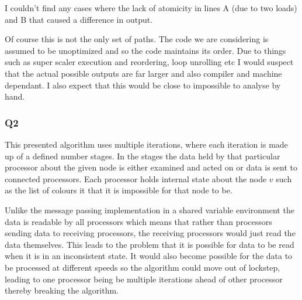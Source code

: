 \documentclass[11pt,a4paper]{article}
\begin{document}
I couldn't find any cases where the lack of atomicity in lines A (due to two loads)
and B that caused a difference in output.

Of course this is not the only set of paths. The code we are
considering is assumed to be unoptimized and so the code maintains its order. Due to things
such as super scaler execution and reordering, loop unrolling etc I
would suspect that the actual possible outputs are far larger and also
compiler and machine dependant. I also expect that this would be close
to impossible to analyse by hand.

\newpage
\subsubsection*{Q2}

This presented algorithm uses multiple iterations, where each iteration is
made up of a defined number stages. In the stages the data held by that particular processor
about the given node is either examined and acted on or data is sent to connected processors.
Each processor holds internal state about the node $v$ such as the list of colours it that it is impossible for that node to be.

Unlike the message passing implementation in a shared variable environment the data is readable by all processors which means that rather
than processors sending data to receiving processors, the receiving processors would just read the data themselves. This leads to the problem that it is possible for data to be read when it is in an inconsistent state. It would also become possible for the data to be processed at different speeds so the algorithm could move out of lockstep, leading to one processor being be multiple iterations ahead of other processor thereby breaking the algorithm.
\end{document}
